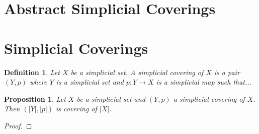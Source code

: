 \documentclass{amsart}
\newtheorem{proposition}{Proposition}[section]
\newtheorem{definition}{Definition}[section]
\begin{document}
\section{Abstract Simplicial Coverings}

\section{Simplicial Coverings}

\begin{definition}
Let $X$ be a simplicial set. A simplicial covering of $X$ is a pair $(Y,p)$ where $Y$ is a simplicial set and $p\colon Y\longrightarrow X$ is a simplicial map such that...
\end{definition}

\begin{proposition}
Let $X$ be a simplicial set and $(Y,p)$ a simplicial covering of $X$. Then $(\vert Y\vert,\vert p\vert)$ is covering of $\vert X\vert$.
\end{proposition}

\begin{proof}

\end{proof}




\end{document}
